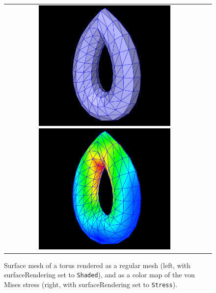 \begin{figure}[h]
\begin{center}
\begin{tabular}{cc}
\else
 \includegraphics[width=2.8in]{images/torusSurfaceShaded}
 \includegraphics[width=2.8in]{images/torusSurfaceStress}
\fi
\end{tabular}
\end{center}
\caption{Surface mesh of a torus rendered as a regular
mesh (left, with {\sf surfaceRendering} set to {\tt Shaded}), and as a
color map of the von Mises stress (right, with {\sf surfaceRendering}
set to {\tt Stress}).}
\label{femSurfaceRender:fig} 
\end{figure}

